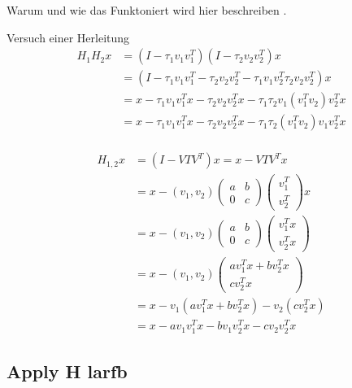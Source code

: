 Warum und wie das Funktoniert wird hier beschreiben \cite{Joffrain:2006:AHT:1141885.1141886}.

Versuch einer Herleitung
\begin{align*}
	H_1 H_2 x &= (I-\tau_1 v_1 v_1^T)(I-\tau_2 v_2 v_2^T)x\\
	&= (I - \tau_1 v_1 v_1^T - \tau_2 v_2 v_2^T -  \tau_1 v_1 v_2^T \tau_2 v_2 v_2^T )x\\
  &= x - \tau_1 v_1 v_1^T x - \tau_2 v_2 v_2^T x - \tau_1 \tau_2 v_1 (v_1^T v_2 )v_2^T x\\
  &= x - \tau_1 v_1 v_1^T x - \tau_2 v_2 v_2^T x - \tau_1 \tau_2 (v_1^T v_2 ) v_1 v_2^T x\\
\end{align*}

\begin{align*}
  H_{1,2} x &= (I - V T V^T) x = x - V T V^T x\\
  &= x - (v_1, v_2)
  \begin{pmatrix}
    a & b \\ 0 & c
  \end{pmatrix}
  \begin{pmatrix}
    v_1^T \\ v_2^T 
  \end{pmatrix}
  x\\
  &= x - (v_1, v_2)
  \begin{pmatrix}
    a & b \\ 0 & c
  \end{pmatrix}
  \begin{pmatrix}
    v_1^T x \\ v_2^T x
  \end{pmatrix}\\
  &= x - (v_1, v_2)
  \begin{pmatrix}
    a v_1^T x + b v_2^T x\\  c v_2^T x
  \end{pmatrix}\\
  &= x - v_1(a v_1^T x + b v_2^T x) - v_2 (c v_2^T x)\\
  &= x - a v_1 v_1^T x - b v_1 v_2^T x - c v_2 v_2^T x
\end{align*}

\subsection{Apply H larfb}

